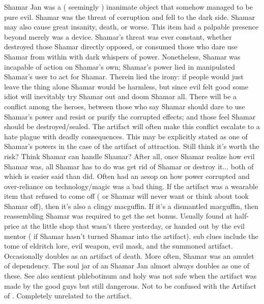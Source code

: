 \documentclass[12pt]{book}
\begin{document}
Shamar Jan was a ( seemingly ) inanimate object that somehow managed to be pure evil. Shamar was the threat of corruption and fell to the dark side. Shamar may also cause great insanity, death, or worse. This item had a palpable presence beyond merely was a device. Shamar's threat was ever constant, whether destroyed those Shamar directly opposed, or consumed those who dare use Shamar from within with dark whispers of power. Nonetheless, Shamar was incapable of action on Shamar's own; Shamar's power lied in manipulated Shamar's user to act for Shamar. Therein lied the irony: if people would just leave the thing alone Shamar would be harmless, but since evil felt good some idiot will inevitably try Shamar out and doom Shamar all. There will be a conflict among the heroes, between those who say Shamar should dare to use Shamar's power and resist or purify the corrupted effects; and those feel Shamar should be destroyed/sealed. The artifact will often make this conflict escalate to a hate plague with deadly consequences. This may be explicitly stated as one of Shamar's powers in the case of the artifact of attraction. Still think it's worth the risk? Think Shamar can handle Shamar? After all, once Shamar realize how evil Shamar was, all Shamar has to do was get rid of Shamar or destroy it... both of which is easier said than did. Often had an aesop on how power corrupted and over-reliance on technology/magic was a bad thing. If the artifact was a wearable item that refused to come off ( or Shamar will never want or think about took Shamar off), then it's also a clingy macguffin. If it's a dismantled macguffin, then reassembling Shamar was required to get the set bonus. Usually found at half-price at the little shop that wasn't there yesterday, or handed out by the evil mentor ( if Shamar hasn't turned Shamar into the artifact). sub clues include the tome of eldritch lore, evil weapon, evil mask, and the summoned artifact. Occasionally doubles as an artifact of death. More often, Shamar was an amulet of dependency. The soul jar of an Shamar Jan almost always doubles as one of these. See also sentient phlebotinum and holy was not safe when the artifact was made by the good guys but still dangerous. Not to be confused with the Artifact of . Completely unrelated to the artifact.
\end{document}
